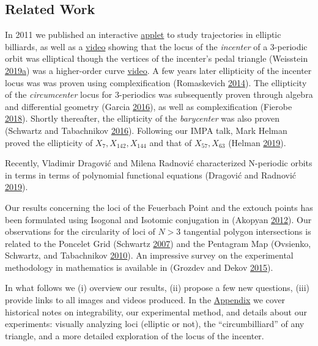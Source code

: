 \documentclass[]{article}
\begin{document}
\hypertarget{related-work}{%
\subsection{Related Work}\label{related-work}}

In 2011 we published an interactive \href{http://demonstrations.wolfram.com/DynamicBilliardsInEllipse/}{applet} to study trajectories in elliptic billiards, as well as a \href{https://youtu.be/BBsyM7RnswA}{video} showing that the locus of the \emph{incenter} of a 3-periodic orbit was elliptical though the vertices of the incenter's pedal triangle (Weisstein \protect\hyperlink{ref-mw}{2019}\protect\hyperlink{ref-mw}{a}) was a higher-order curve \href{https://youtu.be/9xU6T7hQMzs}{video}. A few years later ellipticity of the incenter locus was was proven using complexification (Romaskevich \protect\hyperlink{ref-olga14}{2014}). The ellipticity of the \emph{circumcenter} locus for 3-periodics was subsequently proven through algebra and differential geometry (Garcia \protect\hyperlink{ref-ronaldo16}{2016}), as well as complexification (Fierobe \protect\hyperlink{ref-corentin19}{2018}). Shortly thereafter, the ellipticity of the \emph{barycenter} was also proven (Schwartz and Tabachnikov \protect\hyperlink{ref-sergei2016}{2016}). Following our IMPA talk, Mark Helman proved the ellipticity of \(X_7,X_{142},X_{144}\) and that of \(X_{57},X_{63}\) (Helman \protect\hyperlink{ref-helman19}{2019}).

Recently, Vladimir Dragović and Milena Radnović characterized N-periodic orbits in terms in terms of polynomial functional equations (Dragović and Radnović \protect\hyperlink{ref-dragovic88}{2019}).

Our results concerning the loci of the Feuerbach Point and the extouch points has been formulated using Isogonal and Isotomic conjugation in (Akopyan \protect\hyperlink{ref-akopyan12}{2012}). Our observations for the circularity of loci of \(N>3\) tangential polygon intersections is related to the Poncelet Grid (Schwartz \protect\hyperlink{ref-schwartz07}{2007}) and the Pentagram Map (Ovsienko, Schwartz, and Tabachnikov \protect\hyperlink{ref-sergei10_pentagram}{2010}). An impressive survey on the experimental methodology in mathematics is available in (Grozdev and Dekov \protect\hyperlink{ref-dekov05}{2015}).

In what follows we (i) overview our results, (ii) propose a few new questions, (iii) provide links to all images and videos produced. In the \href{appendices.html}{Appendix} we cover historical notes on integrability, our experimental method, and details about our experiments: visually analyzing loci (elliptic or not), the ``circumbilliard'' of any triangle, and a more detailed exploration of the locus of the incenter.
\end{document}
